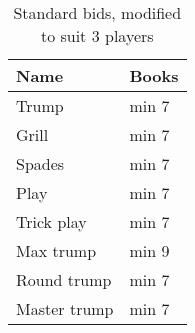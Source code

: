\begin{table}
	\begin{center}
		\footnotesize {
			\begin{tabular}{ p{2.0cm} | p{1.0cm} }
					Name & Books
					\\ \hline
					Trump & min 7 \\ \hline
					Grill & min 7 \\ \hline
					Spades & min 7 \\ \hline
					Play & min 7 \\ \hline
					Trick play & min 7 \\ \hline
					Max trump & min 9 \\ \hline
					Round trump & min 7 \\ \hline
					Master trump & min 7
			\end{tabular}
		}
	\end{center}
	\caption{Standard bids, modified to suit 3 players}
	\label{tab:standardBids3}
\end{table}
